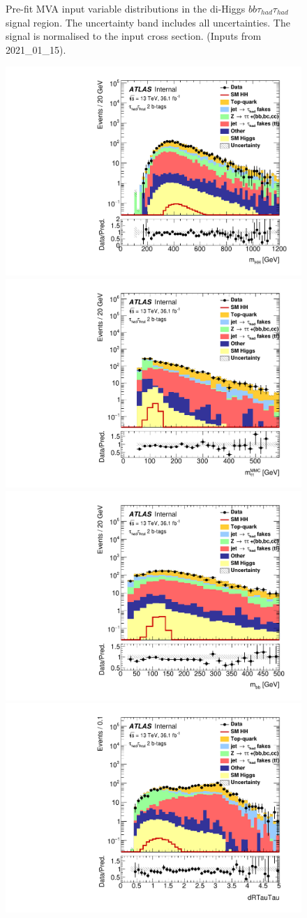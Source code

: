 \begin{figure}
\caption{Pre-fit MVA input variable distributions in the di-Higgs
  $bb\tau_{had}\tau_{had}$ signal region. The uncertainty band includes all uncertainties. The signal is normalised to the input cross section. (Inputs from 2021\_01\_15).}
\label{fig:HadHadPreselectionPNNInputsDistributions}
\end{figure}


\begin{figure}
\centering
\includegraphics[width=.45\textwidth]{figures/selection/HadHad_HH/Plots2015/Region_BMin0_incJet1_distmHH_J2_Y2015_DLLOS_T2_SpcTauHH_L0_Prefitlog.pdf}
\includegraphics[width=.45\textwidth]{figures/selection/HadHad_HH/Plots2015/Region_BMin0_incJet1_distmMMC_J2_Y2015_DLLOS_T2_SpcTauHH_L0_Prefitlog.pdf}\\
\includegraphics[width=.45\textwidth]{figures/selection/HadHad_HH/Plots2015/Region_BMin0_incJet1_distmBB_J2_Y2015_DLLOS_T2_SpcTauHH_L0_Prefitlog.pdf}
\includegraphics[width=.45\textwidth]{figures/selection/HadHad_HH/Plots2015/Region_BMin0_incJet1_distdRTauTau_J2_Y2015_DLLOS_T2_SpcTauHH_L0_Prefitlog.pdf}\\

\end{figure}
